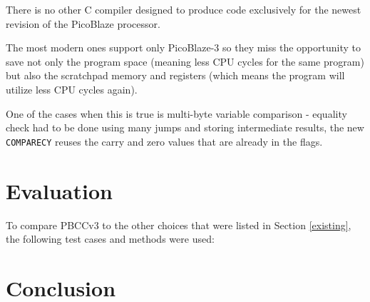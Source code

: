    There is no other C compiler designed to produce code exclusively for the newest revision of the PicoBlaze processor.

    The most modern ones support only PicoBlaze-3 so they miss the opportunity to save not only the program space (meaning less CPU cycles for the same program) but also the scratchpad memory and registers (which means the program will utilize less CPU cycles again).

    One of the cases when this is true is multi-byte variable comparison - equality check had to be done using many jumps and storing intermediate results, the new \texttt{COMPARECY} reuses the carry and zero values that are already in the flags.

\chapter{Evaluation}\label{evaluation}

To compare PBCCv3 to the other choices that were listed in Section \ref{existing}, the following test cases and methods were used:


\chapter{Conclusion}\label{conclusion}


\cite{TBD}
